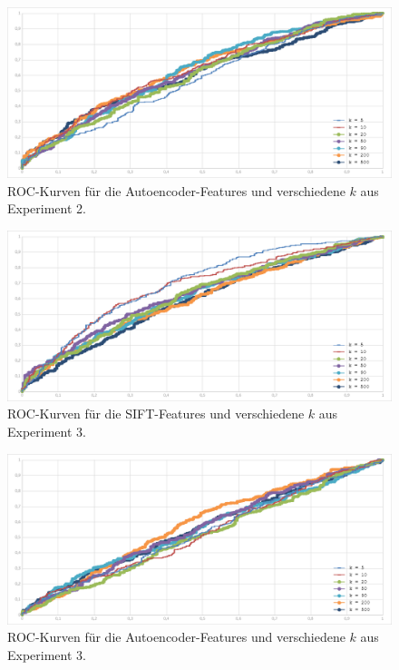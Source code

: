 \begin{figure}
	\centering
	\includegraphics[scale=0.56]{images/exp2_roc36.png}
	\caption{ROC-Kurven für die Autoencoder-Features und verschiedene $k$ aus Experiment 2.}
	\label{img:roc4}
\end{figure}

\begin{figure}
	\centering
	\includegraphics[scale=0.56]{images/exp3_roc128.png}
	\caption{ROC-Kurven für die SIFT-Features und verschiedene $k$ aus Experiment 3.}
	\label{img:roc5}
\end{figure}

\begin{figure}
	\centering
    \includegraphics[scale=0.56]{images/exp3_roc36.png}
    \caption{ROC-Kurven für die Autoencoder-Features und verschiedene $k$ aus Experiment 3.}
    \label{img:roc6}
\end{figure}

